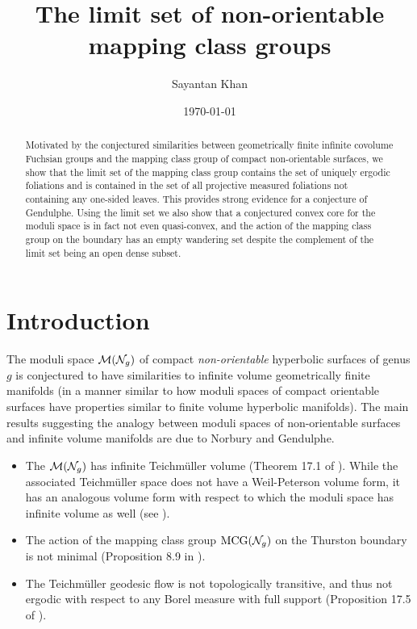 \documentclass[12pt, reqno]{amsart}
\title{The limit set of non-orientable mapping class groups}
\author{Sayantan Khan}
\date{\today}
\begin{document}
\begin{abstract}
  Motivated by the conjectured similarities between geometrically finite infinite covolume Fuchsian groups and the mapping class group of compact non-orientable surfaces, we show that the limit set of the mapping class group contains the set of uniquely ergodic foliations and is contained in the set of all projective measured foliations not containing any one-sided leaves.
  This provides strong evidence for a conjecture of Gendulphe.
  Using the limit set we also show that a conjectured convex core for the moduli
  space is in fact not even quasi-convex, and the action of the mapping class group on the boundary has an empty wandering set despite the complement of the limit set being an open dense subset.
\end{abstract}
\maketitle


\section{Introduction}
\label{sec:introduction-v2}

The moduli space $\mathcal{M}(\mathcal{N}_g)$ of compact \emph{non-orientable} hyperbolic surfaces of genus $g$ is conjectured to have similarities to infinite volume geometrically finite manifolds (in a manner similar to how moduli spaces of compact orientable surfaces have properties similar to finite volume hyperbolic manifolds).
The main results suggesting the analogy between moduli spaces of non-orientable surfaces and infinite volume manifolds are due to Norbury and Gendulphe.

\begin{itemize}
\item The $\mathcal{M}(\mathcal{N}_g)$ has infinite Teichm\"uller volume (Theorem 17.1 of \cite{gendulphe_whats_2017}).
  While the associated Teichm\"uller space does not have a Weil-Peterson volume form, it has an analogous volume form with respect to which the moduli space has infinite volume as well (see \cite{norbury2008lengths}).
\item The action of the mapping class group $\mathrm{MCG}(\mathcal{N}_g)$ on the Thurston boundary is not minimal (Proposition 8.9 in \cite{gendulphe_whats_2017}).
\item The Teichm\"uller geodesic flow is not topologically transitive, and thus not ergodic with respect to any Borel measure with full support (Proposition 17.5 of \cite{gendulphe_whats_2017}).
\end{itemize}
\end{document}
